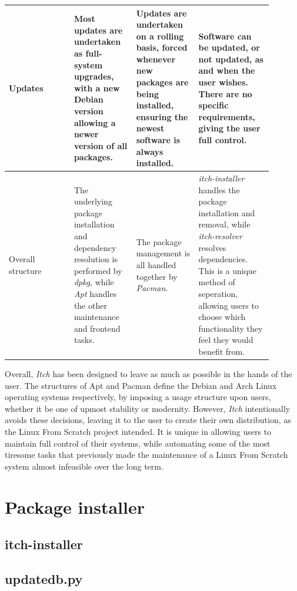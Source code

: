 \documentclass[10pt]{article}
\begin{document}
\begin{center}
\begin{longtable}{|p{0.22\linewidth}|p{0.21\linewidth}|p{0.21\linewidth}|p{0.25\linewidth}|}
    \hline
    Updates & Most updates are undertaken as full-system upgrades, with a new Debian version allowing a newer version of all packages. & Updates are undertaken on a rolling basis, forced whenever new packages are being installed, ensuring the newest software is always installed. & Software can be updated, or not updated, as and when the user wishes. There are no specific requirements, giving the user full control. \\
    \hline
    Overall structure & The underlying package installation and dependency resolution is performed by \textit{dpkg}, while \textit{Apt} handles the other maintenance and frontend tasks. & The package management is all handled together by \textit{Pacman}. & \textit{itch-installer} handles the package installation and removal, while \textit{itch-resolver} resolves dependencies. This is a unique method of seperation, allowing users to choose which functionality they feel they would benefit from.\\
    \hline
\end{longtable}
\end{center}
Overall, \textit{Itch} has been designed to leave as much as possible in the hands of the user. The structures of Apt and Pacman define the Debian and Arch Linux operating systems respectively, by imposing a usage structure upon users, whether it be one of upmost stability or modernity. However, \textit{Itch} intentionally avoids these decisions, leaving it to the user to create their own distribution, as the Linux From Scratch project intended. It is unique in allowing users to maintain full control of their systems, while automating some of the most tiresome tasks that previously made the maintenance of a Linux From Scratch system almost infeasible over the long term.

\pagebreak
\appendix

\section{Package installer}

\subsection{itch-installer}


\subsection{updatedb.py}

\end{document}

